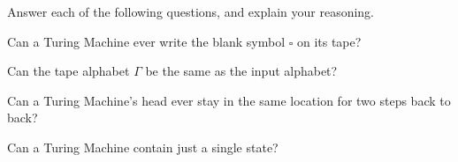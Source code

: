 \documentclass[12pt]{article}
\newenvironment{exercise}[2][Exercise]{\begin{trivlist}
\item[\hskip \labelsep {\bfseries #1}\hskip \labelsep {\bfseries #2.}]}{\end{trivlist}}
\newenvironment{solution}[1][{\color{red} Solution:}]{\begin{trivlist}
\item[\hskip \labelsep {\bfseries #1}\hskip \labelsep {\bfseries}]}{\end{trivlist}}
\begin{document}
 

\newcommand{\studentName}{YOUR NAME HERE} %

\newcommand{\collaborators}{
	with \textit{COLLABORATORS' NAMES HERE}
}

\begin{exercise}{1}

Answer each of the following questions, and explain your reasoning.
\begin{enumerate}[(a)]
	\setlength{\itemsep}{10em}
	\item Can a Turing Machine ever write the blank symbol $\square$ on its tape?
	\begin{solution}
	\end{solution}
	
	\item Can the tape alphabet $\Gamma$ be the same as the input alphabet?
	\begin{solution}
	\end{solution}
	
	\item Can a Turing Machine's head ever stay in the same location for two steps back to back?
	\begin{solution}
	\end{solution}
	
	\item Can a Turing Machine contain just a single state?
	\begin{solution}
	\end{solution}
\end{enumerate}
\end{exercise}
\end{document}
